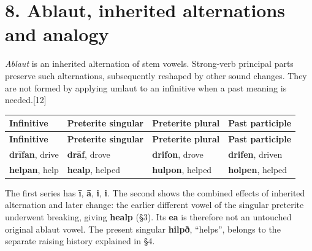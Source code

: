 \section*{8. Ablaut, inherited alternations and analogy}
\emph{Ablaut} is an inherited alternation of stem vowels. Strong-verb principal parts preserve such alternations, subsequently reshaped by other sound changes. They are not formed by applying umlaut to an infinitive when a past meaning is needed.[12]\par
\begingroup
\fontsize{10.5}{13.2}\selectfont
\setlength{\LTleft}{0pt}
\setlength{\LTright}{0pt plus 1fil}
\begin{longtable}{@{}>{\raggedright\arraybackslash}p{}>{\raggedright\arraybackslash}p{}>{\raggedright\arraybackslash}p{}>{\raggedright\arraybackslash}p{}@{}}
\toprule
\textbf{Infinitive} & \textbf{Preterite singular} & \textbf{Preterite plural} & \textbf{Past participle} \\
\midrule
\endfirsthead
\toprule
\textbf{Infinitive} & \textbf{Preterite singular} & \textbf{Preterite plural} & \textbf{Past participle} \\
\midrule
\endhead
\bottomrule
\endfoot
\bottomrule
\endlastfoot
\textbf{drīfan}, drive & \textbf{drāf}, drove & \textbf{drifon}, drove & \textbf{drifen}, driven \\
\textbf{helpan}, help & \textbf{healp}, helped & \textbf{hulpon}, helped & \textbf{holpen}, helped \\
\end{longtable}
\endgroup
The first series has \textbf{ī}, \textbf{ā}, \textbf{i}, \textbf{i}. The second shows the combined effects of inherited alternation and later change: the earlier different vowel of the singular preterite underwent breaking, giving \textbf{healp} (§3). Its \textbf{ea} is therefore not an untouched original ablaut vowel. The present singular \textbf{hilpð}, “helps”, belongs to the separate raising history explained in §4.\par
